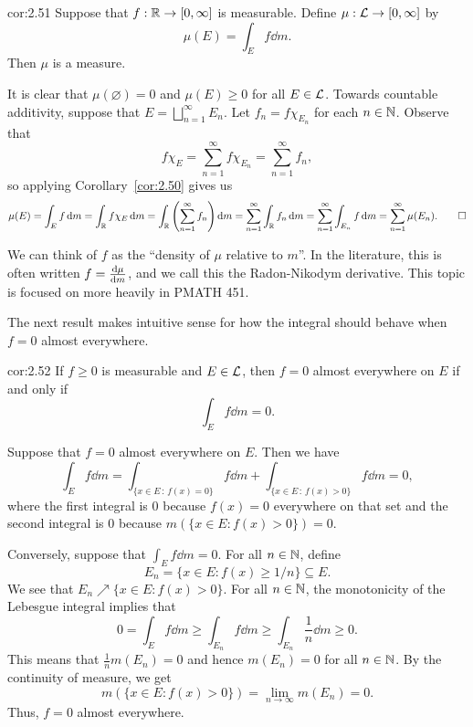 \begin{cor}{cor:2.51}
    Suppose that $f : \mathbb{R} \to [0, \infty]$ is measurable. Define 
    $\mu : {\cal L} \to [0, \infty]$ by 
    \[ \mu(E) = \int_E f\dd m. \] 
    Then $\mu$ is a measure. 
\end{cor}
\begin{pf}
    It is clear that $\mu(\varnothing) = 0$ and $\mu(E) \geq 0$ for all 
    $E \in {\cal L}$. Towards countable additivity, suppose that 
    $E = \bigsqcup_{n=1}^\infty E_n$. Let $f_n = f\chi_{E_n}$ for each 
    $n \in \mathbb{N}$. Observe that 
    \[ f\chi_E = \sum_{n=1}^\infty f\chi_{E_n} = \sum_{n=1}^\infty f_n, \] 
    so applying Corollary~\ref{cor:2.50} gives us 
    \[ \mu(E) = \int_E f\,\mathrm{d} m 
    = \int_{\mathbb{R}} f\chi_E \,\mathrm{d} m 
    = \int_{\mathbb{R}} \left( \sum_{n=1}^\infty f_n \right)\textrm{d}m 
    = \sum_{n=1}^\infty \int_{\mathbb{R}} f_n\,\mathrm{d} m 
    = \sum_{n=1}^\infty \int_{E_n} f\,\mathrm{d} m 
    = \sum_{n=1}^\infty \mu(E_n). \qedhere \] 
\end{pf}

We can think of $f$ as the ``density of $\mu$ relative to $m$''. 
In the literature, this is often written $f = \frac{{\rm d}\mu}{{\rm d}m}$, 
and we call this the Radon-Nikodym derivative. This topic is focused on 
more heavily in PMATH 451. 

The next result makes intuitive sense for how the integral should behave 
when $f = 0$ almost everywhere. 

\begin{cor}{cor:2.52}
    If $f \geq 0$ is measurable and $E \in {\cal L}$, then $f = 0$ 
    almost everywhere on $E$ if and only if 
    \[ \int_E f\dd m = 0. \] 
\end{cor}
\begin{pf}
    Suppose that $f = 0$ almost everywhere on $E$. Then we have 
    \[ \int_E f\dd m = \int_{\{x\in E\,:\,f(x) = 0\}} f\dd m 
    + \int_{\{x\in E\,:\,f(x) > 0\}} f\dd m = 0, \] 
    where the first integral is $0$ because $f(x) = 0$ everywhere on that set 
    and the second integral is $0$ because $m(\{x\in E : f(x) > 0\}) = 0$. 

    Conversely, suppose that $\int_E f\dd m = 0$. For all $n \in \mathbb{N}$, define 
    \[ E_n = \{x \in E : f(x) \geq 1/n\} \subseteq E. \] 
    We see that $E_n \nearrow \{x \in E : f(x) > 0\}$. For all $n \in \mathbb{N}$, 
    the monotonicity of the Lebesgue integral implies that 
    \[ 0 = \int_E f\dd m \geq \int_{E_n} f\dd m \geq \int_{E_n} 
    \frac1n\dd m \geq 0. \] 
    This means that $\frac1n m(E_n) = 0$ and hence $m(E_n) = 0$ for all 
    $n \in \mathbb{N}$. By the continuity of measure, we get 
    \[ m(\{x \in E : f(x) > 0\}) = \lim_{n\to\infty} m(E_n) = 0. \] 
    Thus, $f = 0$ almost everywhere. 
\end{pf}

